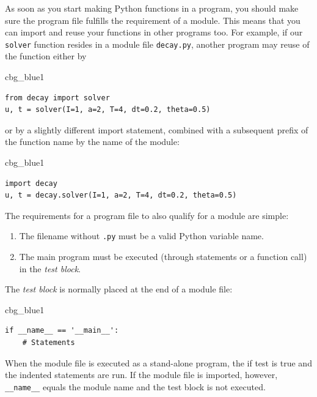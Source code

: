 \documentclass[%
oneside,                 %
final,                   %
10pt]{article}
\newenvironment{_cod_tight}[1]{
   \def\FrameCommand{\colorbox{#1}}
   \FrameRule0.6pt\MakeFramed {\FrameRestore}\vskip3mm}
   {\vskip0mm\endMakeFramed}
\newenvironment{cod}[1]{
\bgroup\rmfamily
\fboxsep=0mm\relax
\begin{_cod_tight}{#1}
\list{}{\parsep=-2mm\parskip=0mm\topsep=0pt\leftmargin=2mm
\rightmargin=2\leftmargin\leftmargin=4pt\relax}
\item\relax}
{\endlist\end{_cod_tight}\egroup}
\begin{document}
As soon as you start making Python functions in a program, you should
make sure the program file fulfills the requirement of a module.
This means that you can import and reuse your functions in other
programs too. For example, if our \texttt{solver} function resides in a
module file \texttt{decay.py}, another program may reuse of the
function either by

\begin{cod}{cbg_blue1}\begin{Verbatim}[numbers=none,fontsize=\fontsize{9pt}{9pt},baselinestretch=0.95,xleftmargin=2mm]
from decay import solver
u, t = solver(I=1, a=2, T=4, dt=0.2, theta=0.5)
\end{Verbatim}
\end{cod}
\noindent
or by a slightly different import statement, combined with a subsequent
prefix of the function name by the name of the module:

\begin{cod}{cbg_blue1}\begin{Verbatim}[numbers=none,fontsize=\fontsize{9pt}{9pt},baselinestretch=0.95,xleftmargin=2mm]
import decay
u, t = decay.solver(I=1, a=2, T=4, dt=0.2, theta=0.5)
\end{Verbatim}
\end{cod}
\noindent

The requirements for a program file to also qualify for a module are simple:

\begin{enumerate}
\item The filename without \texttt{.py} must be a valid Python variable name.

\item The main program must be executed (through statements or
   a function call) in the \emph{test block}.
\end{enumerate}

\noindent
The \emph{test block} is normally placed at the end of a module file:

\begin{cod}{cbg_blue1}\begin{Verbatim}[numbers=none,fontsize=\fontsize{9pt}{9pt},baselinestretch=0.95,xleftmargin=2mm]
if __name__ == '__main__':
    # Statements
\end{Verbatim}
\end{cod}
\noindent
When the module file is executed as a stand-alone program, the if test
is true and the indented statements are run. If the module file
is imported, however, \Verb!__name__! equals the module name and the test block
is not executed.
\end{document}
